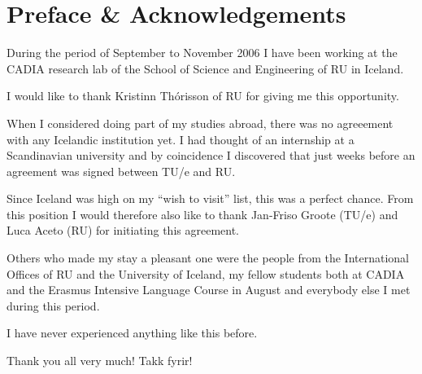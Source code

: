 \chapter*{Preface \& Acknowledgements}

During the period of September to November 2006 I have been working at the
\ac{CADIA} research lab of the School of Science and Engineering of \ac{RU} in
Iceland.

I would like to thank Kristinn Th\'orisson of \ac{RU} for giving me this
opportunity.

When I considered doing part of my studies abroad, there was no agreeement with
any Icelandic institution yet. I had thought of an internship at a Scandinavian
university and by coincidence I discovered that just weeks before an agreement
was signed between \ac{TU/e} and \ac{RU}. 

Since Iceland was high on my ``wish to visit'' list, this was a perfect chance.
From this position I would therefore also like to thank Jan-Friso Groote
(\ac{TU/e}) and Luca Aceto (\ac{RU}) for initiating this agreement.

Others who made my stay a pleasant one were the people from the International
Offices of \ac{RU} and the University of Iceland, my fellow students both at
\ac{CADIA} and the Erasmus Intensive Language Course in August and everybody
else I met during this period.

I have never experienced anything like this before.

\vspace{2em}

Thank you all very much! Takk fyrir!
